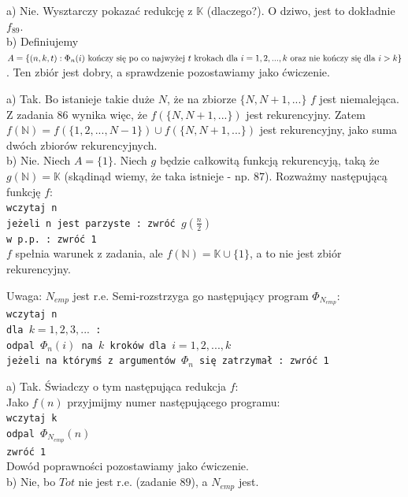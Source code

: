\documentclass[a4paper,11pt]{article}
\newenvironment{zadanie}[1]
  {\renewcommand\theinnercustomthm{#1}\innercustomthm}
  {\endinnercustomthm}
\begin{document}
\begin{zadanie}{102}
\end{zadanie}
a) Nie. Wysztarczy pokazać redukcję z $\mathbb{K}$ (dlaczego?). O dziwo, jest to dokładnie $f_{89}$. \\

b) Definiujemy $A = \{ (n,k,t) : \Phi_n(i) \text{ kończy się po co najwyżej $t$ krokach dla } \\ 
i=1,2,...,k \text{ oraz nie kończy się dla $i > k$} \}$. Ten zbiór jest dobry, a sprawdzenie pozostawiamy jako ćwiczenie.


\begin{zadanie}{103}
\end{zadanie}
a) Tak. Bo istanieje takie duże $N$, że na zbiorze $\{ N, N+1, ... \}$ $f$ jest niemalejąca. Z zadania $86$ wynika więc, 
że $f(\{ N, N+1, ... \})$ jest rekurencyjny. Zatem $f(\mathbb{N}) = f(\{ 1,2, ... ,N-1 \}) \cup f(\{ N, N+1, ... \})$ jest
rekurencyjny, jako suma dwóch zbiorów rekurencyjnych. \\

b) Nie. Niech $A = \{1\}$. Niech $g$ będzie całkowitą funkcją rekurencyją, taką że $g(\mathbb{N}) = \mathbb{K}$ 
(skądinąd wiemy, że taka istnieje - np. $87$). Rozważmy następującą funkcję $f$: \\
\texttt{wczytaj n \\ jeżeli n jest parzyste : zwróć $g(\frac{n}{2})$ \\ w p.p. : zwróć 1 \\}
$f$ spełnia warunek z zadania, ale $f(\mathbb{N}) = \mathbb{K} \cup \{ 1 \}$, a to nie jest zbiór rekurencyjny.


\begin{zadanie}{105}
\end{zadanie}
Uwaga: $N_{emp}$ jest r.e. Semi-rozstrzyga go następujący program $\Phi_{N_{emp}}$: \\
\texttt{wczytaj n \\ dla $k=1,2,3,...$ : \\ odpal $\Phi_n(i)$ na $k$ kroków dla $i=1,2,...,k$ \\ jeżeli na którymś z argumentów $\Phi_n$ się zatrzymał : zwróć 1 \\}

a) Tak. Świadczy o tym następująca redukcja $f$: \\
Jako $f(n)$ przyjmijmy numer następującego programu: \\
\texttt{wczytaj k \\ odpal $\Phi_{N_{emp}}(n)$ \\ zwróć 1 \\}
Dowód poprawności pozostawiamy jako ćwiczenie. \\

b) Nie, bo $Tot$ nie jest r.e. (zadanie $89$), a $N_{emp}$ jest.\\
\end{document}
